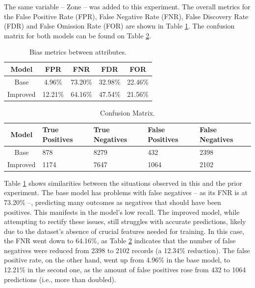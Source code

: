 \documentclass[fleqn,10pt]{wlscirep}
\begin{document}
The same variable -- Zone -- was added to this experiment. The overall metrics for the False Positive Rate (FPR), False Negative Rate (FNR), False Discovery Rate (FDR) and False Omission Rate (FOR) are shown in Table \ref{tab_bias_hfalta:}. The confusion matrix for both models can be found on Table \ref{tab_cm_hfalta:}.

\begin{table}[!htb]
\centering
\begin{tabular}{|c|c|c|c|c|}\hline
        \textbf{Model} & \textbf{FPR} & \textbf{FNR} & \textbf{FDR} & \textbf{FOR} \\ \hline
        Base & 4.96\% & 73.20\% & 32.98\% & 22.46\%  \\ 
        Improved & 12.21\% & 64.16\% & 47.54\% & 21.56\% \\ 
        \hline
    \end{tabular}
\caption{Bias metrics between attributes.}
\label{tab_bias_hfalta:}
\end{table}

\begin{table}[!htb]
\centering
\begin{tabular}{|c|p{3cm}|p{3cm}|p{3cm}|p{3cm}|}
        \hline
        \textbf{Model} & \textbf{True Positives} & \textbf{True Negatives} & \textbf{False Positives} & \textbf{False Negatives}\\ \hline
        Base & 878 & 8279 & 432 & 2398  \\ 
        Improved & 1174 & 7647 & 1064 & 2102  \\ 
        \hline
    \end{tabular}
\caption{Confusion Matrix.}
\label{tab_cm_hfalta:}
\end{table}

Table \ref{tab_bias_hfalta:} shows similarities between the situations observed in this and the prior experiment. The base model has problems with false negatives -- as its FNR is at 73.20\% --, predicting many outcomes as negatives that should have been positives. This manifests in the model's low recall. The improved model, while attempting to rectify these issues, still struggles with accurate predictions, likely due to the dataset's absence of crucial features needed for training. In this case, the FNR went down to 64.16\%, as Table \ref{tab_cm_hfalta:} indicates that the number of false negatives were reduced from 2398 to 2102 records (a 12.34\% reduction). The false positive rate, on the other hand, went up from 4.96\% in the base model, to 12.21\% in the second one, as the amount of false positives rose from 432 to 1064 predictions (i.e., more than doubled). 
\end{document}
